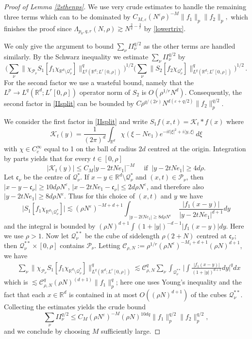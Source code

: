 \documentclass[11pt]{amsart}
\theoremstyle{definition}
\numberwithin{theorem}{section}
\numberwithin{definition}{section}
\numberwithin{equation}{section}
\def\nuv{\nu}
\def\inn#1#2{\langle#1,#2\rangle}
\newcommand{\Be}{\begin{equation}}
\newcommand{\Ee}{\end{equation}}
\renewcommand{\le}{\leqslant}
\renewcommand{\ge}{\geqslant}
\def\inn#1#2{\langle#1,#2\rangle}
\def\lc{\lesssim}
\def\gc{\gtrsim}
\def\eps{\varepsilon}
\def\fc{{\mathfrak {c}}}
\def\bbR{{\mathbb {R}}}
\def\cC{{\mathcal {C}}}
\def\cK{{\mathcal {K}}}
\def\cP{{\mathcal {P}}}
\def\cQ{{\mathcal {Q}}}
\renewcommand{\le}{\leqslant}
\renewcommand{\ge}{\geqslant}
\begin{document}
\begin{proof}[Proof of Lemma \ref{2sthenps}]
We use very crude estimates to handle the remaining three terms
which can to be dominated by
$C_{M,\eps}(N^\eps \rho)^{-M}\|f_1\|_p \|f_2\|_p,$ which finishes the proof since
$\Lambda_{p_0,q,r}(N,\rho)\gc N^{\frac 2q -\frac 2r}$ by \eqref{lowertriv}.

We  only give the argument to bound $\sum_\nuv I\!I_\nuv^{q/2}$ as
the other terms  are handled similarly. By the Schwarz inequality we estimate $\sum_\nuv I\!I_\nuv^{q/2}$ by
\Be\label{IIsplit}
\Big(\sum_\nuv \big\|\chi_{\cP_\nuv}S_1[f_1\chi_{\bbR^d\setminus
\cQ_\nuv^*}]\big\|^q_{L^q(\bbR^d;L^r[0,\rho])}\Big)^{1/2} \Big(\sum_\nuv
\big\|S_2[f_2\chi_{\cQ_\nuv^*}]\big\|_{L^q(\bbR^d;L^r[0,\rho])}^q\Big)^{1/2}\,. \Ee
For the second factor we use a  wasteful bound,
namely that the $L^p\to L^q(\bbR^d; L^r[0,\rho])$ operator norm of
$S_2$ is $O(\rho^{1/r}N^{d})$. Consequently, the second factor in
\eqref{IIsplit} can be bounded by $C\rho^{q/(2r)}
N^{d(\eps+q/2)}\|f_2\|_p^{q/2}$.

We consider the first factor in \eqref{IIsplit} and write
 $S_1f(x,t)= \cK_t*f(x)$ where
$$
\cK_t(y)=\frac{1}{(2\pi)^{d}}
\int_{\mathbb{R}^d}
\chi(\xi-Ne_1)e^{-it|\xi|^2+i\inn{y}{\xi}}\,d\xi
$$
with $\chi \in C_c^\infty$ equal to 1 on the ball of radius $2d$ centred at the origin.
Integration by parts yields that for every $t\in [0,\rho]$
$$|\cK_t(y)|\le C_{M}|y-2tNe_1|^{-M}\quad\text{ if }\ |y-2tNe_1|\ge 4d\rho.$$
 Let $\fc_\nuv$ be the centre of
$\cQ_\nuv^*$. If $x-y\in \bbR^d\setminus \cQ^*_\nuv$ and $(x,t)\in
\cP_\nuv$, then $|x-y-\fc_\nu|\ge 10d \rho N^\eps$,
$|x-2tNe_1-\fc_\nu| \le 2d \rho N^\eps$,  and therefore also $|y-2t Ne_1|
\ge 8d \rho N^\eps$. Thus for this choice of $(x,t)$ and $y$ we have
$$
\big|S_1[f_1 \chi_{\bbR^d\setminus \cQ_\nuv^*}]\big| \lc (\rho
N^{\eps})^{-M+d+1} \int_{\substack{|y-2tNe_1|\ge 8d\rho  N^\eps}}
\frac{|f_1(x-y)|}{|y-2tNe_1|^{d+1}}dy
$$ and the integral is  bounded by
$(\rho N)^{d+1}\int (1+|y|)^{-d-1} |f_1(x-y)|dy$. Here we use
$\rho> 1$. Now let $\cQ_\nuv^{**}$ be the cube of sidelength
$\rho(2+N)$ centred at $\fc_\nu$; then
$\cQ_\nuv^{**}\times[0,\rho]$ contains $\cP_\nuv$. Letting
$\cC_{\rho,N}:=\rho^{1/r}(\rho N^{\eps})^{-M_1+d+1}(\rho N)^{d+1}$,
we have
\begin{align*}&\sum_\nuv
 \big\|\chi_{\cP_\nuv}S_1[f_1\chi_{\bbR^d\setminus \cQ_\nuv^*}]\big\|_{L^q(\bbR^d;L^r[0,\rho])}^q
\lc\cC_{\rho,N}^q\sum_\nuv \int_{\cQ_\nuv^{**}}\Big| \int
\frac{|f_1(x-y)|}{(1+|y|)^{d+1}}dy\Big|^q dx
\end{align*}
which is $\lc\cC_{\rho,N}^q(\rho N)^{(d+1)}
\|f_1\|_p^q$; here one uses Young's inequality and the fact that
each $x\in \bbR^d$ is contained in at most $O((\rho N)^{d+1})$ of the cubes $\cQ_\nu^{**}$.
Collecting the estimates yields  the crude bound
$$\sum_\nuv I\!I_\nuv^{q/2}
\le C_{M} (\rho N^{\eps})^{-M} (\rho N)^{10dq} \|f_1\|_p^{q/2}
\|f_2\|_p^{q/2},$$
and we conclude by  choosing $M$ sufficiently large.
\end{proof}
\end{document}
